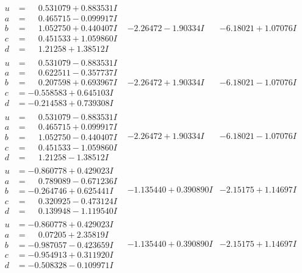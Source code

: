 \documentclass[1p]{elsarticle_modified}
\theoremstyle{definition}
\begin{document}
$$\begin{array}{c|c|c}
\begin{aligned}
u &= \phantom{-}0.531079 + 0.883531 I \\
a &= \phantom{-}0.465715 - 0.099917 I \\
b &= \phantom{-}1.052750 + 0.440407 I \\
c &= \phantom{-}0.451533 + 1.059860 I \\
d &= \phantom{-}1.21258 + 1.38512 I\end{aligned}
 & -2.26472 - 1.90334 I & -6.18021 + 1.07076 I \\ \hline\begin{aligned}
u &= \phantom{-}0.531079 - 0.883531 I \\
a &= \phantom{-}0.622511 - 0.357737 I \\
b &= \phantom{-}0.207598 + 0.693967 I \\
c &= -0.558583 + 0.645103 I \\
d &= -0.214583 + 0.739308 I\end{aligned}
 & -2.26472 + 1.90334 I & -6.18021 - 1.07076 I \\ \hline\begin{aligned}
u &= \phantom{-}0.531079 - 0.883531 I \\
a &= \phantom{-}0.465715 + 0.099917 I \\
b &= \phantom{-}1.052750 - 0.440407 I \\
c &= \phantom{-}0.451533 - 1.059860 I \\
d &= \phantom{-}1.21258 - 1.38512 I\end{aligned}
 & -2.26472 + 1.90334 I & -6.18021 - 1.07076 I \\ \hline\begin{aligned}
u &= -0.860778 + 0.429023 I \\
a &= \phantom{-}0.789089 - 0.671236 I \\
b &= -0.264746 + 0.625441 I \\
c &= \phantom{-}0.320925 - 0.473124 I \\
d &= \phantom{-}0.139948 - 1.119540 I\end{aligned}
 & -1.135440 + 0.390890 I & -2.15175 + 1.14697 I \\ \hline\begin{aligned}
u &= -0.860778 + 0.429023 I \\
a &= \phantom{-}0.07205 + 2.35819 I \\
b &= -0.987057 - 0.423659 I \\
c &= -0.954913 + 0.311920 I \\
d &= -0.508328 - 0.109971 I\end{aligned}
 & -1.135440 + 0.390890 I & -2.15175 + 1.14697 I\\

\end{array}$$
\end{document}
